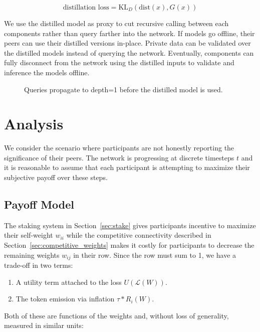 \documentclass{article}
\begin{document}
\begin{equation}
\textrm{distillation loss} = \text{KL}_D(\text{dist}(x), G(x)) 
\end{equation}

We use the distilled model as proxy to cut recursive calling between each components rather than query farther into the network. If models go offline, their peers can use their distilled versions in-place. Private data can be validated over the distilled models instead of querying the network. Eventually, components can fully disconnect from the network using the distilled inputs to validate and inference the models offline.

\begin{figure}[H]
	\centering
	\hspace*{0cm}
	
	\caption{Queries propagate to depth=1 before the distilled model is used.}
\end{figure}{}

\section{Analysis}
\label{analysis}

We consider the scenario where participants are not honestly reporting the significance of their peers. The network is progressing at discrete timesteps $t$ and it is reasonable to assume that each participant is attempting to maximize their subjective payoff over these steps.

\subsection{Payoff Model}

The staking system in Section~\ref{sec:stake} gives participants incentive to maximize their self-weight $w_{ii}$ while the competitive connectivity described in Section~\ref{sec:competitive_weights} makes it costly for participants to decrease the remaining weights $w_{ij}$ in their row. Since the row must sum to 1, we have a trade-off in two terms:

\begin{enumerate}
	\item A utility term attached to the loss $U(\mathcal{L}(W))$.
	\item The token emission via inflation $\tau * R_i(W)$. 
\end{enumerate}

Both of these are functions of the weights and, without loss of generality, measured in similar units:
\end{document}
